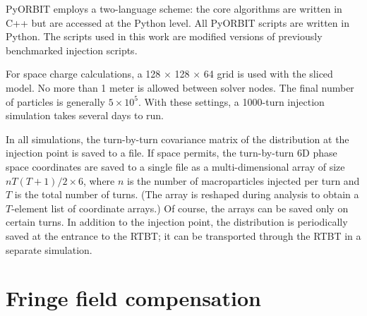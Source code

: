 PyORBIT employs a two-language scheme: the core algorithms are written in C++ but are accessed at the Python level. All PyORBIT scripts are written in Python. The scripts used in this work are modified versions of previously benchmarked injection scripts.

For space charge calculations, a 128 $\times$ 128 $\times$ 64 grid is used with the sliced model. No more than 1 meter is allowed between solver nodes. The final number of particles is generally $5 \times 10^{5}$. With these settings, a 1000-turn injection simulation takes several days to run.

In all simulations, the turn-by-turn covariance matrix of the distribution at the injection point is saved to a file. If space permits, the turn-by-turn 6D phase space coordinates are saved to a single file as a multi-dimensional array of size $n T (T + 1) / 2 \times 6$, where $n$ is the number of macroparticles injected per turn and $T$ is the total number of turns. (The array is reshaped during analysis to obtain a $T$-element list of coordinate arrays.) Of course, the arrays can be saved only on certain turns. In addition to the injection point, the distribution is periodically saved at the entrance to the RTBT; it can be transported through the RTBT in a separate simulation.




\section{Fringe field compensation}

